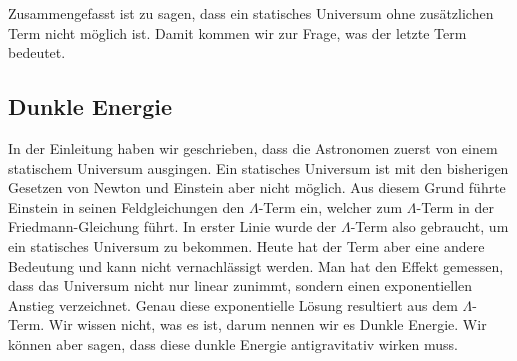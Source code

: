 \begin{refsection}
Zusammengefasst ist zu sagen, dass ein statisches Universum ohne zusätzlichen Term nicht möglich ist. Damit kommen wir zur Frage, was der letzte Term bedeutet.

\subsection{Dunkle Energie}
In der Einleitung haben wir geschrieben, dass die Astronomen zuerst von einem statischem Universum ausgingen. Ein statisches Universum ist mit den bisherigen Gesetzen von Newton und Einstein aber nicht möglich. Aus diesem Grund führte Einstein in seinen Feldgleichungen den $\Lambda$-Term ein, welcher zum $\Lambda$-Term in der Friedmann-Gleichung führt. In erster Linie wurde der $\Lambda$-Term also gebraucht, um ein statisches Universum zu bekommen. Heute hat der Term aber eine andere Bedeutung und kann nicht vernachlässigt werden. Man hat den Effekt gemessen, dass das Universum nicht nur linear zunimmt, sondern einen exponentiellen Anstieg verzeichnet. Genau diese exponentielle Lösung resultiert aus dem $\Lambda$-Term. Wir wissen nicht, was es ist, darum nennen wir es Dunkle Energie. Wir können aber sagen, dass diese dunkle Energie antigravitativ wirken muss.

\end{refsection}
